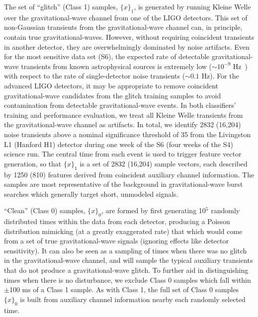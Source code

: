 \documentclass[prd, twocolumn, lengthcheck, superscriptaddress, showpacs, letterpaper, nofootinbib]{revtex4-1}
\newcommand\auxvec{x}
\begin{document}
The set of ``glitch'' (Class 1) samples, $\{\auxvec\}_1$, is generated by running Kleine Welle over the gravitational-wave channel from one of the \ac{LIGO} detectors. 
This set of non-Gaussian transients from the gravitational-wave channel can, in principle, contain true gravitational-waves. However, without requiring coincident transients in another detector, they are overwhelmingly dominated by noise artifacts. Even for the most sensitive data set (S6), the expected rate of detectable gravitational-wave transients from known astrophysical sources is extremely low (${\sim}10^{-9}$ Hz~\cite{ratesdoc}) with respect to the rate of single-detector noise transients (${\sim}0.1$ Hz). For the advanced LIGO detectors, it may be appropriate to remove coincident gravitational-wave candidates from the glitch training samples to avoid contamination from detectable gravitational-wave events.
In both classifiers' training and performance evaluation, we treat all Kleine Welle transients from the gravitational-wave channel as artifacts. In total, we identify 2832 (16,204) noise transients above a nominal significance threshold of 35 from the Livingston L1 (Hanford H1) detector during one week of the S6 (four weeks of the S4) science run. The central time from each event is used to trigger feature vector generation, so that $\{\auxvec\}_1$ is a set of 2832 (16,204) sample vectors, each described by 1250 (810) features derived from coincident auxiliary channel information.  
The samples are most representative of the background in gravitational-wave burst searches which generally target short, unmodeled signals.

``Clean'' (Class 0) samples, $\{\auxvec\}_0$, are formed by first generating 10$^5$ randomly distributed times within the data from each detector, producing a Poisson distribution mimicking (at a greatly exaggerated rate) that which would come from a set of true gravitational-wave signals (ignoring effects like detector sensitivity). It can also be seen as a sampling of times when there was no glitch in the gravitational-wave channel, and will sample the typical auxiliary transients that do not produce a gravitational-wave glitch. To further aid in distinguishing times when there is no disturbance, we exclude Class 0 samples which fall within $\pm$100 ms of a Class 1 sample. As with Class 1, the full set of Class 0 samples $\{\auxvec\}_0$ is built from auxiliary channel information nearby each randomly selected time.

\end{document}
